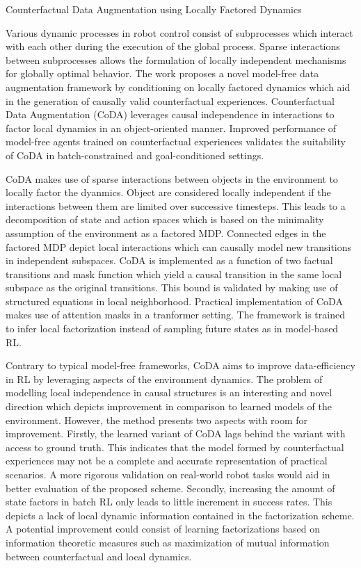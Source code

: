 \documentclass[11pt,letterpaper]{article}
\begin{document}
\begin{center}
  \large{Counterfactual Data Augmentation using Locally Factored Dynamics}
\end{center}

Various dynamic processes in robot control consist of subprocesses which interact with each other during the execution of the global process. Sparse interactions between subprocesses allows the formulation of locally independent mechanisms for globally optimal behavior. The work proposes a novel model-free data augmentation framework by conditioning on locally factored dynamics which aid in the generation of causally valid counterfactual experiences. Counterfactual Data Augmentation (CoDA) leverages causal independence in interactions to factor local dynamics in an object-oriented manner. Improved performance of model-free agents trained on counterfactual experiences validates the suitability of CoDA in batch-constrained and goal-conditioned settings. 

CoDA makes use of sparse interactions between objects in the environment to locally factor the dyanmics. Object are considered locally independent if the interactions between them are limited over successive timesteps. This leads to a decomposition of state and action spaces which is based on the minimality assumption of the environment as a factored MDP. Connected edges in the factored MDP depict local interactions which can causally model new transitions in independent subspaces. CoDA is implemented as a function of two factual transitions and mask function which yield a causal transition in the same local subspace as the original transitions. This bound is validated by making use of structured equations in local neighborhood. Practical implementation of CoDA makes use of attention masks in a tranformer setting. The framework is trained to infer local factorization instead of sampling future states as in model-based RL. 

Contrary to typical model-free frameworks, CoDA aims to improve data-efficiency in RL by leveraging aspects of the environment dynamics. The problem of modelling local independence in causal structures is an interesting and novel direction which depicts improvement in comparison to learned models of the environment. However, the method presents two aspects with room for improvement. Firstly, the learned variant of CoDA lags behind the variant with access to ground truth. This indicates that the model formed by counterfactual experiences may not be a complete and accurate representation of practical scenarios. A more rigorous validation on real-world robot tasks would aid in better evaluation of the proposed scheme. Secondly, increasing the amount of state factors in batch RL only leads to little increment in success rates. This depicts a lack of local dynamic information contained in the factorization scheme. A potential improvement could consist of learning factorizations based on information theoretic measures such as maximization of mutual information between counterfactual and local dynamics. 
\end{document}
